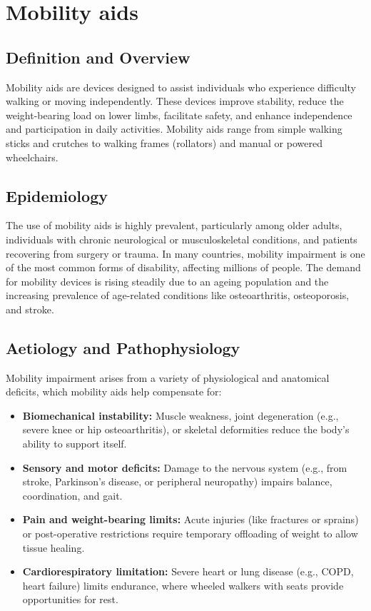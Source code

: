\chapter{Mobility aids}

\section*{Definition and Overview}
Mobility aids are devices designed to assist individuals who experience difficulty walking or moving independently. These devices improve stability, reduce the weight-bearing load on lower limbs, facilitate safety, and enhance independence and participation in daily activities. Mobility aids range from simple walking sticks and crutches to walking frames (rollators) and manual or powered wheelchairs.

\section*{Epidemiology}
The use of mobility aids is highly prevalent, particularly among older adults, individuals with chronic neurological or musculoskeletal conditions, and patients recovering from surgery or trauma. In many countries, mobility impairment is one of the most common forms of disability, affecting millions of people. The demand for mobility devices is rising steadily due to an ageing population and the increasing prevalence of age-related conditions like osteoarthritis, osteoporosis, and stroke.

\section*{Aetiology and Pathophysiology}
Mobility impairment arises from a variety of physiological and anatomical deficits, which mobility aids help compensate for:

\begin{itemize}
    \item \textbf{Biomechanical instability:} Muscle weakness, joint degeneration (e.g., severe knee or hip osteoarthritis), or skeletal deformities reduce the body's ability to support itself.
    \item \textbf{Sensory and motor deficits:} Damage to the nervous system (e.g., from stroke, Parkinson's disease, or peripheral neuropathy) impairs balance, coordination, and gait.
    \item \textbf{Pain and weight-bearing limits:} Acute injuries (like fractures or sprains) or post-operative restrictions require temporary offloading of weight to allow tissue healing.
    \item \textbf{Cardiorespiratory limitation:} Severe heart or lung disease (e.g., COPD, heart failure) limits endurance, where wheeled walkers with seats provide opportunities for rest.
\end{itemize}


